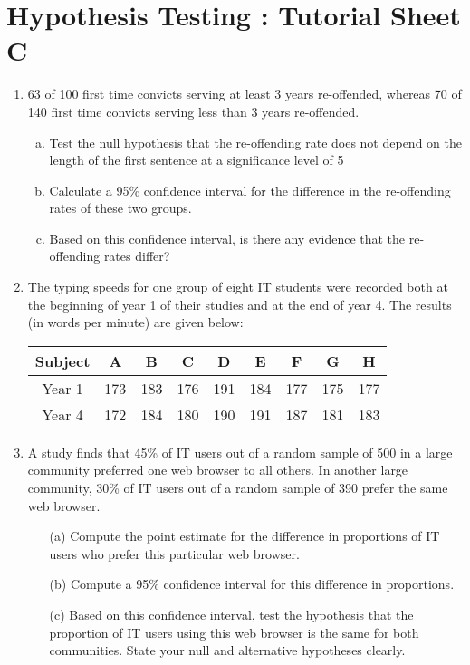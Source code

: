 \documentclass[]{article}
\begin{document}
\section*{Hypothesis Testing : Tutorial Sheet C}

\begin{enumerate}
\item 
63 of 100 first time convicts serving at least 3 years re-offended, whereas 70 of 140 first time convicts serving less than 3 years re-offended. 
\begin{enumerate}[(a)]
\item	Test the null hypothesis that the re-offending rate does not depend on the length of the first sentence at a significance level of 5%
\item 	Calculate a 95\% confidence interval for the difference in the re-offending rates of these two groups.
\item 	Based on this confidence interval, is there any evidence that the re-offending rates differ? 
\end{enumerate}

\item The typing speeds for one group of eight IT students were recorded both at the beginning of
year 1 of their studies and at the end of year 4. The results (in words per minute) are given
below:
\begin{center}
\begin{tabular}{|c|c|c|c|c|c|c|c|c|} \hline 
  Subject & A& B& C& D& E& F& G& H \\ \hline
Year 1& 173& 183& 176& 191& 184& 177& 175& 177 \\ \hline
Year 4& 172& 184& 180& 190& 191& 187& 181& 183 \\ \hline
\end{tabular}
\end{center}
\item 
A study finds that 45\% of IT users out of a random sample of 500 in a
large community preferred one web browser to all others. In another large
community, 30\% of IT users out of a random sample of 390 prefer the
same web browser.
\begin{itemize}
    \item[(a)] Compute the point estimate for the difference in proportions
of IT users who prefer this particular web browser.
\item[(b)] Compute a 95\% confidence interval for this difference in
proportions.
\item[(c)] Based on this confidence interval, test the hypothesis that
the proportion of IT users using this web browser is the same for both
communities. State your null and alternative hypotheses clearly.
\end{itemize}



\end{enumerate}
\end{document}
